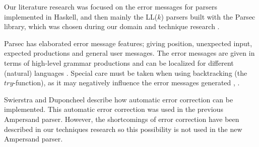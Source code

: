 Our literature research was focused on the error messages for parsers implemented in Haskell, and then mainly the LL($k$) parsers built with the Parsec library, which was chosen during our domain and technique research .

Parsec has elaborated error message features; giving position, unexpected input, expected productions and general user messages.
The error messages are given in terms of high-level grammar productions and can be localized for different (natural) languages .
Special care must be taken when using backtracking (the $try$-function), as it may negatively influence the error messages generated ,  .

Swierstra and Duponcheel  describe how automatic error correction can be implemented.
This automatic error correction was used in the previous Ampersand parser.
However, the shortcomings of error correction have been described in our techniques research \cite{parsing} so this possibility is not used in the new Ampersand parser.












